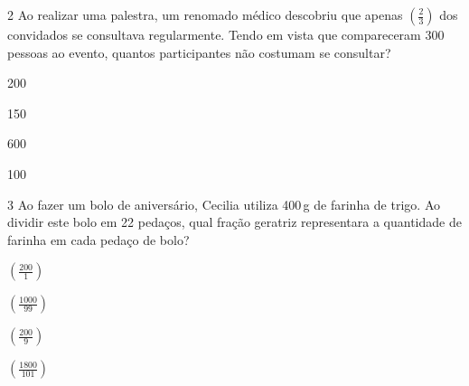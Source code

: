 



\num{2} Ao realizar uma palestra, um renomado médico descobriu que apenas
$(\frac{2}{3})$ dos convidados se consultava regularmente. Tendo em
vista que compareceram 300 pessoas ao evento, quantos participantes não
costumam se consultar?

\begin{escolha}
\item 200
\item 150
\item 600
\item 100
\end{escolha}









\num{3} Ao fazer um bolo de aniversário, Cecilia utiliza 400\,g de farinha de
trigo. Ao dividir este bolo em 22 pedaços, qual fração geratriz
representara a quantidade de farinha em cada pedaço de bolo?

\begin{escolha}
\item $(\frac{200}{1})$ 
\item $(\frac{1000}{99})$ 
\item $(\frac{200}{9})$ 
\item $(\frac{1800}{101})$ 
\end{escolha}

